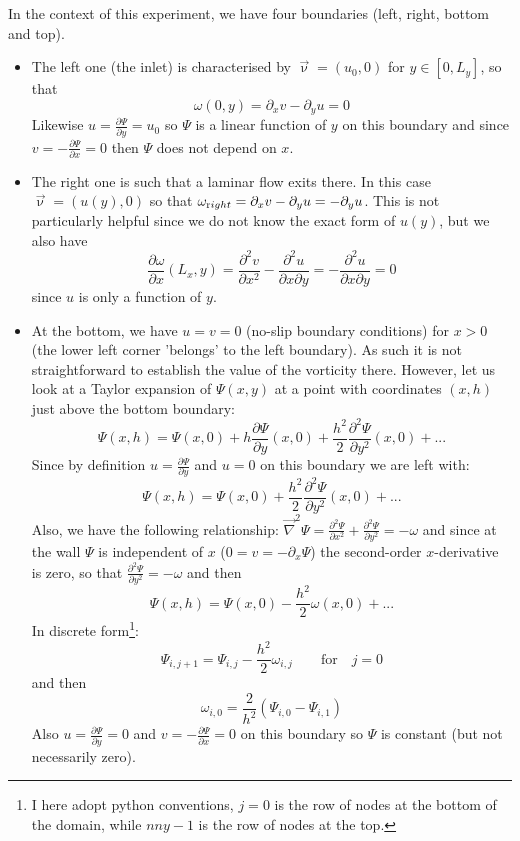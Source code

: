 In the context of this experiment, we have four boundaries (left, right, bottom and top). 
\begin{itemize}

\item The left one (the inlet) is characterised by $\vec\upnu=(u_0,0)$ for $y\in[0,L_y]$, so that 
\begin{equation}
\omega(0,y) = \partial_x v-\partial_y u = 0
\label{eq:omega1}
\end{equation}
Likewise $u=\frac{\partial \Psi}{\partial y}=u_0$ so $\Psi$ is a linear function of $y$ on this boundary and since $v=-\frac{\partial \Psi}{\partial x}=0$ then $\Psi$ does not depend on $x$. 

\item The right one is such that a laminar flow exits there. In this case $\vec\upnu=(u(y),0)$ so that
$\omega_{\text right} = \partial_x v-\partial_y u = -\partial_y u $. This is not particularly helpful since we do not know the exact form of $u(y)$, but we also have 
\begin{equation}
\frac{\partial \omega }{\partial x}(L_x,y) =
\frac{\partial^2 v}{\partial x^2}
-\frac{\partial^2 u}{\partial x\partial y}
= -\frac{\partial^2 u}{\partial x\partial y} =0
\label{eq:omega2}
\end{equation}
since $u$ is only a function of $y$.

\item At the bottom, we have $u=v=0$ (no-slip boundary conditions) for $x>0$ (the lower left corner 'belongs' to the left boundary).
As such it is not straightforward to establish the value of the vorticity there. 
However, let us look at a Taylor expansion of $\Psi(x,y)$ at a point with coordinates $(x,h)$ just above 
the bottom boundary:
\[
\Psi(x,h) = \Psi(x,0) + h \frac{\partial \Psi}{\partial y}(x,0)  
+ \frac{h^2}{2}  \frac{\partial^2 \Psi}{\partial y^2} (x,0) + ...
\]
Since by definition $u=\frac{\partial \Psi}{\partial y}$ and $u=0$ on this boundary we are left with:
\[
\Psi(x,h) = \Psi(x,0) + \frac{h^2}{2}  \frac{\partial^2 \Psi}{\partial y^2}(x,0) + ...
\]
Also, we have the following relationship:
$
\vec\nabla^2 \Psi=
\frac{\partial^2 \Psi}{\partial x^2 }
+\frac{\partial^2 \Psi}{\partial y^2 } = -\omega
$ and since at the wall $\Psi$ is independent of $x$ ($0=v=-\partial_x \Psi$) the second-order $x$-derivative is zero, so that $\frac{\partial^2 \Psi}{\partial y^2 } = -\omega$ and then
\[
\Psi(x,h) = \Psi(x,0) - \frac{h^2}{2}  \omega(x,0) + ...
\]
In discrete form\footnote{I here adopt python conventions, $j=0$ is the row of nodes at the 
bottom of the domain, while $nny-1$ is the row of nodes at the top.}:
\[
\Psi_{i,j+1} = \Psi_{i,j} - \frac{h^2}{2} \omega_{i,j} \qquad \text{for} \quad  j=0
\]
and then
\begin{equation}
\omega_{i,0} = \frac{2}{h^2} (\Psi_{i,0} -\Psi_{i,1} )  
\label{eq:omega3}
\end{equation}
Also $u=\frac{\partial \Psi}{\partial y}=0$ and $v=-\frac{\partial \Psi}{\partial x}=0$ on this boundary so $\Psi$ is constant (but not necessarily zero). 




\end{itemize}
